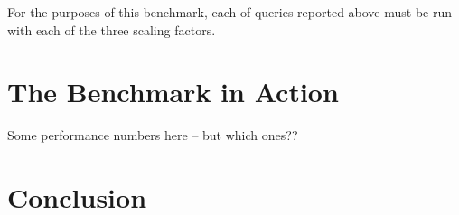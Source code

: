 \documentclass[fleqn,11pt]{article}
\newcommand{\eat}[1]{}
\newcommand{\cheatbaseline}{1.44}
\renewcommand{\baselinestretch}{\cheatbaseline}
\begin{document}
For the purposes of this benchmark, each of queries reported above must be
run with each of the three scaling factors.

\section{The Benchmark in Action}
Some performance numbers here -- but which ones??

\section{Conclusion}


\renewcommand{\baselinestretch}{1.1}
\begin{small}

%

\eat{
\bibitem{PMA}
A.~Apostolico and Z.~Galil.
\newblock Pattern matching algorithms.
\newblock {\em Oxford University Press}, 1997.

\bibitem{Bertino91}
E.~Bertino.
\newblock An indexing technique for object oriented databases.
\newblock {\em ICDE}, pages 14--22, 1991.

\bibitem{bertino}
E.~Bertino and W.~Kim.
\newblock Indexing techniques for queries on nested objects.
\newblock {\em IEEE Transactions on Knowledge and Data Engineering 1(2)}, pages
  196--214, 1989.


\bibitem{bpsm98:xml}
T.~Bray, J.~Paoli, and C.~M. Sperberg-McQueen.
\newblock Extensible markup language ({XML}) 1.0.
\newblock W3C Recommendation. Available at
  http://www.w3.org/TR/1998/REC-xml-19980210, Feb. 1998.
}
\eat{
\bibitem{Jay3}
M.~Carey, J.~Kierman, J.~Shanmugasundaram, E.~Shekita, and S.~Subramanian.
\newblock XPERANTO: Middleware for publishing object relational data as XML
  documents.
\newblock {\em Proceedings of VLDB}, pages 646--648, 2000.

\bibitem{cd+94:shore}
M.~J. Carey, D.~J. DeWitt, M.~J. Franklin, N.~E. Hall, M.~L. McAuliffe, J.~F.
  Naughton, D.~T. Schuh, M.~H. Solomon, C.~K. Tan, O.~G. Tsatalos, S.~J. White,
  and M.~J. Zwilling.
\newblock Shoring up persistent applications.
\newblock In {\em Proceedings of the ACM SIGMOD Conference on Management of
  Data}, pages 383--394, 1994.

\bibitem{crf00:quilt}
D.~D. Chamberlin, J.~Robie, and D.~Florescu.
\newblock Quilt: An {XML} query language for heterogeneous data sources.
\newblock In {\em WebDB (Informal Proceedings)}, pages 53--62, 2000.

}
\end{small}
\end{document}
